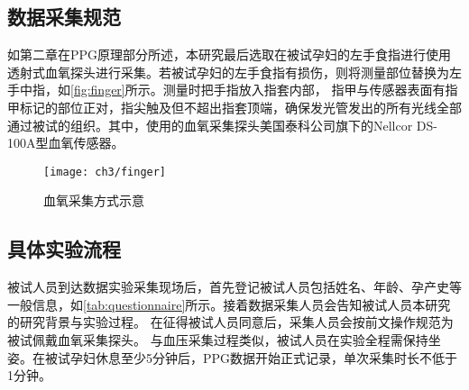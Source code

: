 \subsection{数据采集规范}
如第二章在PPG原理部分所述，本研究最后选取在被试孕妇的左手食指进行使用透射式血氧探头进行采集。若被试孕妇的左手食指有损伤，则将测量部位替换为左手中指，如\autoref{fig:finger}所示。测量时把手指放入指套内部，
指甲与传感器表面有指甲标记的部位正对，指尖触及但不超出指套顶端，确保发光管发出的所有光线全部通过被试的组织。其中，使用的血氧采集探头美国泰科公司旗下的Nellcor DS-100A型血氧传感器。 
\begin{figure}[htbp]
      \centering
      \texttt{[image: ch3/finger]}
      \caption{\label{fig:finger}血氧采集方式示意}
\end{figure}
\subsection{具体实验流程}
被试人员到达数据实验采集现场后，首先登记被试人员包括姓名、年龄、孕产史等一般信息，如\autoref{tab:questionnaire}所示。接着数据采集人员会告知被试人员本研究的研究背景与实验过程。
在征得被试人员同意后，采集人员会按前文操作规范为被试佩戴血氧采集探头\cite{Chen2021}。
与血压采集过程类似\cite{FIGO}，被试人员在实验全程需保持坐姿。在被试孕妇休息至少5分钟后，PPG数据开始正式记录，单次采集时长不低于1分钟。
